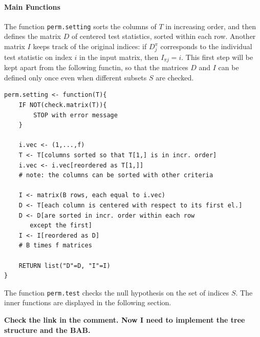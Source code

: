 \documentclass[11pt,a4paper,openright,twoside]{article}
\begin{document}

\vspace{3mm}
\paragraph{Main Functions}
The function \texttt{perm.setting} sorts the columns of $T$ in increasing order, and then defines the matrix $D$ of centered test statistics, sorted within each row. Another matrix $I$ keeps track of the original indices: if $D_j^\pi$ corresponds to the individual test statistic on index $i$ in the input matrix, then $I_{\pi j}=i$. This first step will be kept apart from the following functin, so that the matrices $D$ and $I$ can be defined only once even when different subsets $S$ are checked.
\begin{lstlisting}
perm.setting <- function(T){
	IF NOT(check.matrix(T)){
		STOP with error message
	}
	
	i.vec <- (1,...,f)
	T <- T[columns sorted so that T[1,] is in incr. order]
	i.vec <- i.vec[reordered as T[1,]]
	# note: the columns can be sorted with other criteria

	I <- matrix(B rows, each equal to i.vec)
	D <- T[each column is centered with respect to its first el.]
	D <- D[are sorted in incr. order within each row
	   except the first]
	I <- I[reordered as D]
	# B times f matrices

	RETURN list("D"=D, "I"=I)
}
\end{lstlisting}




\vspace{3mm}
The function \texttt{perm.test} checks the null hypothesis on the set of indices $S$. The inner functions are displayed in the following section.

\textbf{Check the link in the comment. Now I need to implement the tree structure and the BAB.}
\end{document}
